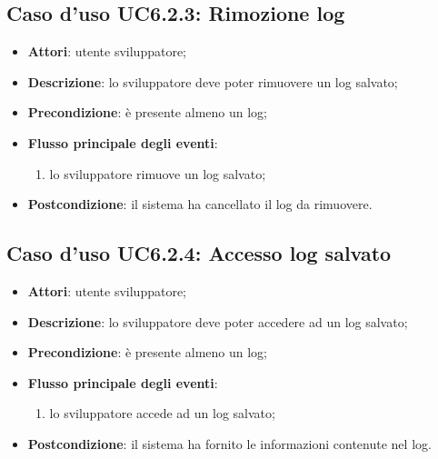 \documentclass[../AnalisiDeiRequisiti.tex]{subfiles}
\begin{document}
\subsection{Caso d'uso UC6.2.3: Rimozione log}
\begin{itemize}
\item \textbf{Attori}: utente sviluppatore;
\item \textbf{Descrizione}: lo sviluppatore deve poter rimuovere un log salvato; 
      \item \textbf{Precondizione}: è presente almeno un log;

        \item \textbf{Flusso principale degli eventi}:
          \begin{enumerate}
          \item lo sviluppatore rimuove un log salvato;

      \end{enumerate}
    \item \textbf{Postcondizione}: il sistema ha cancellato il log da rimuovere.
  \end{itemize}
\hypertarget{UC6.2.4}{}
\subsection{Caso d'uso UC6.2.4: Accesso log salvato}
\begin{itemize}
\item \textbf{Attori}: utente sviluppatore;
\item \textbf{Descrizione}: lo sviluppatore deve poter accedere ad un log salvato; 
      \item \textbf{Precondizione}: è presente almeno un log;

        \item \textbf{Flusso principale degli eventi}:
          \begin{enumerate}
          \item lo sviluppatore accede ad un log salvato;

      \end{enumerate}
    \item \textbf{Postcondizione}: il sistema ha fornito le informazioni contenute nel log.
  \end{itemize}
\hypertarget{UC7}{}
\end{document}
